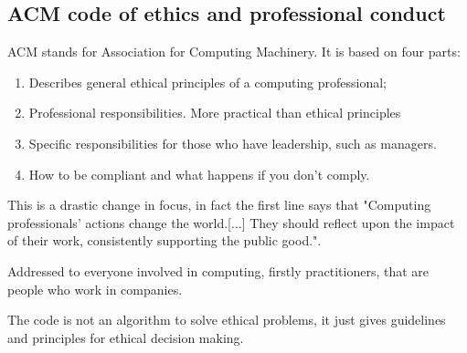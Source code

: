 \subsection{ACM code of ethics and professional conduct}
ACM stands for Association for Computing Machinery. It is based on four parts:
\begin{enumerate}
    \item Describes general ethical principles of a computing professional;
    \item Professional responsibilities. More practical than ethical principles
    \item Specific responsibilities for those who have leadership, such as managers.
    \item How to be compliant and what happens if you don't comply.
\end{enumerate}
This is a drastic change in focus, in fact the first line says that "Computing professionals' actions change the world.[...] They should reflect upon the impact of their work, consistently supporting the public good.". 

Addressed to everyone involved in computing, firstly practitioners, that are people who work in companies.

The code is not an algorithm to solve ethical problems, it just gives guidelines and principles for ethical decision making.
